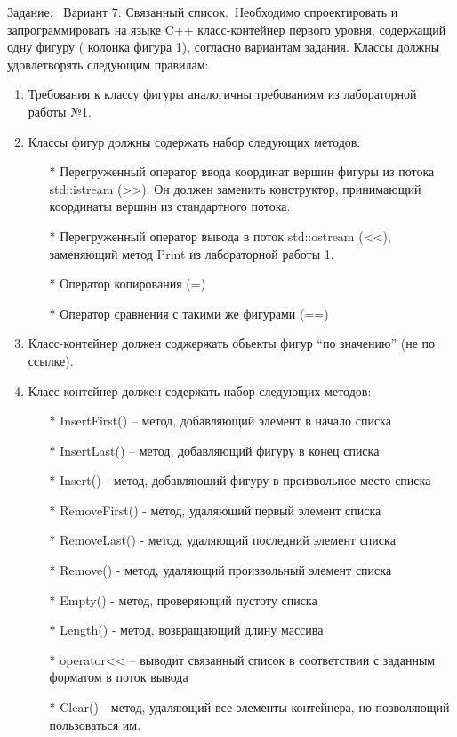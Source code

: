 \documentclass[12pt]{article}
\begin{document}
Задание: \
Вариант 7: Связанный список.\
Необходимо спроектировать и запрограммировать на языке C++ класс-контейнер первого уровня, содержащий одну фигуру ( колонка фигура 1), согласно вариантам задания. Классы должны удовлетворять следующим правилам:
\begin{enumerate}
\item Требования к классу фигуры аналогичны требованиям из лабораторной работы №1.
\item Классы фигур должны содержать набор следующих методов:
\begin{itemsize}
\begin{enumerate}
    \item[*] Перегруженный оператор ввода координат вершин фигуры из потока std::istream (>>). Он должен заменить конструктор, принимающий координаты вершин из стандартного потока.
    \item[*] Перегруженный оператор вывода в поток std::ostream (<<), заменяющий метод Print из лабораторной работы 1. 
    \item[*] Оператор копирования (=)
    \item[*] Оператор сравнения с такими же фигурами (==)
\end{enumerate}
\end{itemsize}
\item Класс-контейнер должен соджержать объекты фигур “по значению” (не по ссылке).
\item Класс-контейнер должен содержать набор следующих методов:
\begin{itemsize}
\begin{enumerate}

    \item[*] InsertFirst() – метод, добавляющий элемент в начало списка
    \item[*] InsertLast() – метод, добавляющий фигуру в конец списка
    \item[*] Insert() - метод, добавляющий фигуру в произвольное место списка
    \item[*] RemoveFirst() - метод, удаляющий первый элемент списка
    \item[*] RemoveLast() - метод, удаляющий последний элемент списка
    \item[*] Remove() - метод, удаляющий произвольный элемент списка
    \item[*] Empty() - метод, проверяющий пустоту списка
    \item[*] Length() - метод, возвращающий длину массива
    \item[*] operator<< – выводит связанный список в соответствии с заданным форматом в поток вывода
    \item[*] Clear() - метод, удаляющий все элементы контейнера, но позволяющий пользоваться им.
\end{enumerate}
\end{itemsize}
\end{enumerate}
\end{document}
